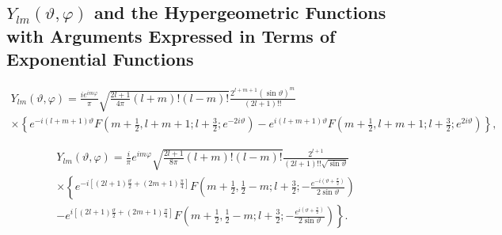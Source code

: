 \subsection{$Y_{l m}(\vartheta, \varphi)$ and the Hypergeometric Functions with Arguments Expressed in Terms of Exponential Functions}\label{sec:5.2.6}
\begin{corrected}
\begin{multline}
Y_{l m}(\vartheta, \varphi)=\frac{i e^{i m \varphi}}{\pi} \sqrt{\frac{2 l+1}{4 \pi}(l+m)!(l-m)!} \frac{2^{l+m+1}(\sin \vartheta)^{m}}{(2 l+1)!!}  \\
\times\left\{e^{-i(l+m+1) \vartheta} F\left(m+\frac{1}{2}, l+m+1 ; l+\frac{3}{2} ; e^{-2 i \vartheta}\right)-e^{i(l+m+1) \vartheta} F\left(m+\frac{1}{2}, l+m+1 ; l+\frac{3}{2} ; e^{2 i \vartheta}\right)\right\},  \label{eq:5:2:35}
\end{multline}
\end{corrected}
\begin{multline}
Y_{l m}(\vartheta, \varphi)=\frac{i}{\pi} e^{i m \varphi} \sqrt{\frac{2 l+1}{8 \pi}(l+m)!(l-m)!} \frac{2^{l+1}}{(2 l+1)!!\sqrt{\sin \vartheta}}  %
\\
\times\left\{e^{-i\left[(2 l+1) \frac{\vartheta}{2}+(2 m+1) \frac{\pi}{4}\right]} F\left(m+\frac{1}{2}, \frac{1}{2}-m ; l+\frac{3}{2} ;-\frac{e^{-i\left(\vartheta+\frac{\pi}{2}\right)}}{2 \sin \vartheta}\right)\right.  %
\\
\left.-e^{i\left[(2 l+1) \frac{\vartheta}{2}+(2 m+1) \frac{\pi}{4}\right]} F\left(m+\frac{1}{2}, \frac{1}{2}-m ; l+\frac{3}{2} ;-\frac{e^{i\left(\vartheta+\frac{\pi}{2}\right)}}{2 \sin \vartheta}\right)\right\} . \label{eq:5:2:36}
\end{multline}
